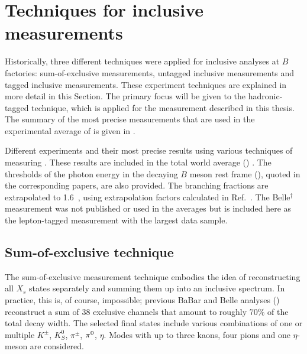 \section{Techniques for inclusive \safeBtoXsgamma measurements}\label{sec:btosgamma_techniques}
Historically, three different techniques were applied for inclusive \BtoXsgamma analyses at $B$ factories: 
sum-of-exclusive measurements,
untagged inclusive measurements and
tagged inclusive measurements.
These experiment techniques are explained in more detail in this Section.
The primary focus will be given to the hadronic-tagged technique, which is applied for the measurement described in this thesis.
The summary of the most precise measurements that are used in the experimental average of  is given in .

{\renewcommand{\arraystretch}{1.2}
 \begin{table}[hbtp!]
     \centering
     \caption{\label{tab:btosgamma_inclusive_summary}
     Different experiments and their most precise results using various techniques of measuring \BtoXsgamma.
     These results are included in the total \BtoXsgamma world average () \cite{Amhis:2022mac,Workman:2022ynf}.
     The thresholds of the photon energy in the decaying $B$ meson rest frame (\EB), quoted in the corresponding papers, are also provided.
     The branching fractions are extrapolated to 1.6~\gev, using extrapolation factors calculated in Ref.~\cite{Buchmuller:2005zv}.
     The Belle$^{\dagger}$ measurement was not published or used in the averages but is included here as the lepton-tagged measurement with the largest data sample.
     }
     
 \end{table}
 }

\subsection{Sum-of-exclusive technique}\label{sec:sum_of_exclusive}

The sum-of-exclusive measurement technique embodies the idea of reconstructing all $X_s$ states separately and summing them up into an inclusive spectrum.
In practice, this is, of course, impossible; previous BaBar and Belle analyses (\cite{BaBar:2012eja,Belle:2014nmp}) reconstruct a sum of 38 exclusive channels that amount to roughly 70\% of the total \BtoXsgamma decay width.
The selected final states include various combinations of one or multiple $K^{\pm}$, $K_S^0$, $\pi^{\pm}$, $\pi^0$, $\eta$.
Modes with up to three kaons, four pions and one $\eta$-meson are considered.


